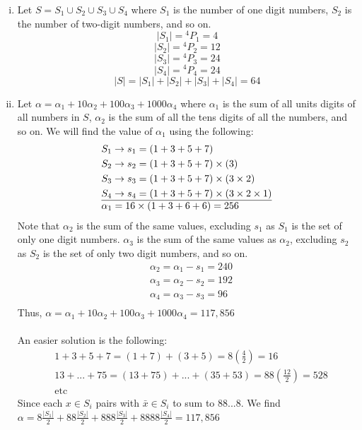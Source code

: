 \documentclass[11pt,twosided]{article}
\newcommand{\Perm}[2]{{}^{#1}\!P_{#2}}%
\begin{document}
\begin{solution}
    \begin{enumerate}[(i)]
        \item Let $S = S_1 \cup S_2 \cup S_3 \cup S_4$ where $S_1$ is the number of one digit numbers, $S_2$ is the number of two-digit numbers, and so on. \\
            \[|S_1| = \Perm{4}{1} = 4\]
            \[|S_2| = \Perm{4}{2} = 12\]
            \[|S_3| = \Perm{4}{3} = 24\]
            \[|S_4| = \Perm{4}{4} = 24\]
            \[|S| = |S_1| + |S_2| + |S_3| + |S_4| = \boxed{64}\]
        \item Let $\alpha = \alpha_1 + 10\alpha_2 + 100\alpha_3 + 1000\alpha_4$ where $\alpha_1$ is the sum of all units digits of all numbers in $S$, $\alpha_2$ is the sum of all the tens digits of all the numbers, and so on. We will find the value of $\alpha_1$ using the following: 
        \begin{align*}
            &S_1 \rightarrow s_1 = (1+3+5+7)\\
            &S_2 \rightarrow s_2 = (1+3+5+7)\times (3)\\
            &S_3 \rightarrow s_3 = (1+3+5+7)\times (3\times2)\\
            &S_4 \rightarrow s_4 = (1+3+5+7)\times (3\times2\times1)\\
            \hline
            &\alpha_1 = 16 \times (1+3+6+6) = 256
        \end{align*}
        Note that $\alpha_2$ is the sum of the same values, excluding $s_1$ as $S_1$ is the set of only one digit numbers. $\alpha_3$ is the sum of the same values as $\alpha_2$, excluding $s_2$ as $S_2$ is the set of only two digit numbers, and so on.
        \begin{align*}
            &\alpha_2 = \alpha_1 - s_1 = 240\\
            &\alpha_3 = \alpha_2 - s_2 = 192\\
            &\alpha_4 = \alpha_3 - s_3 = 96\\
        \end{align*}
        Thus, $\alpha = \alpha_1 + 10\alpha_2 + 100\alpha_3 + 1000\alpha_4 = \boxed{117,856}$
        \\\\
        An easier solution is the following:
        \begin{align*}
            &1 + 3 + 5 + 7 = (1 + 7) + (3 + 5) = 8(\frac{4}{2}) = 16\\
            &13 + ... + 75 = (13 + 75) + ... + (35 + 53) = 88(\frac{12}{2}) = 528\\
            &\text{etc}
        \end{align*}
        Since each $x \in S_i$ pairs with $ \bar{x} \in S_i$ to sum to $88...8$. We find $\alpha = 8\frac{|S_1|}{2} + 88\frac{|S_2|}{2} + 888\frac{|S_3|}{2} + 8888\frac{|S_4|}{2} = \boxed{117,856}$
    \end{enumerate}
    
\end{solution}
\end{document}
